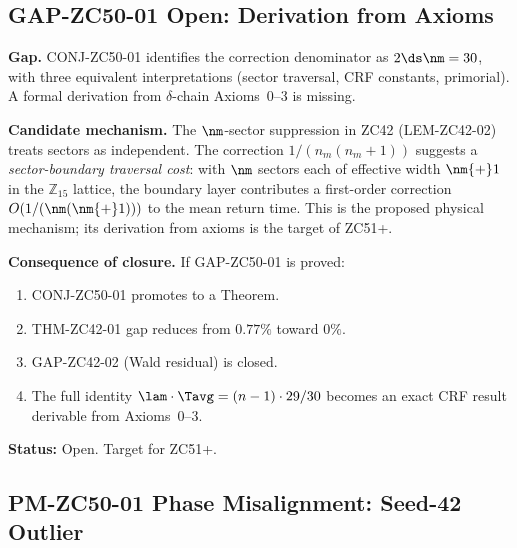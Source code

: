 \documentclass[12pt, a4paper]{article}
\begin{document}
\subsection{GAP-ZC50-01 \quad Open: Derivation from Axioms}


\begin{openqbox}[title={GAP-ZC50-01: Derive $1/(2\ds\nm)$
  Correction from $\delta$-Chain Axioms}]
\textbf{Gap.}
CONJ-ZC50-01 identifies the correction denominator as
$2\ds\nm = 30$, with three equivalent interpretations
(sector traversal, CRF constants, primorial). A formal derivation
from $\delta$-chain Axioms~0--3 is missing.

\textbf{Candidate mechanism.}
The $\nm$-sector suppression in ZC42 (LEM-ZC42-02) treats sectors as
independent. The correction $1/(n_m(n_m{+}1))$ suggests a
\emph{sector-boundary traversal cost}: with $\nm$ sectors each of
effective width $\nm{+}1$ in the $\mathbb{Z}_{15}$ lattice, the
boundary layer contributes a first-order correction
$O(1/(\nm(\nm{+}1)))$ to the mean return time. This is the
proposed physical mechanism; its derivation from axioms is the
target of ZC51+.

\textbf{Consequence of closure.}
If GAP-ZC50-01 is proved:
\begin{enumerate}[leftmargin=2em]
\item CONJ-ZC50-01 promotes to a Theorem.
\item THM-ZC42-01 gap reduces from $0.77\%$ toward $0\%$.
\item GAP-ZC42-02 (Wald residual) is closed.
\item The full identity $\lam\cdot\Tavg = (n-1)\cdot 29/30$
  becomes an exact CRF result derivable from Axioms~0--3.
\end{enumerate}

\textbf{Status:} Open. Target for ZC51+.
\end{openqbox}

\subsection{PM-ZC50-01 \quad Phase Misalignment: Seed-42 Outlier}

\end{document}

